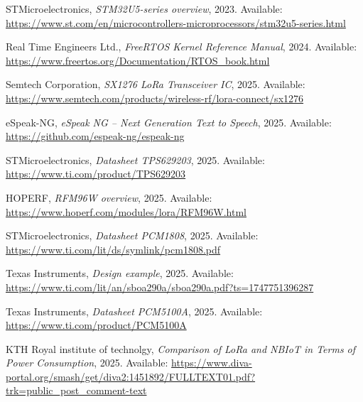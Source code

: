 \begin{thebibliography}{1}
STMicroelectronics,
\textit{STM32U5-series overview},
2023.
Available: \url{https://www.st.com/en/microcontrollers-microprocessors/stm32u5-series.html}

Real Time Engineers Ltd.,
\textit{FreeRTOS Kernel Reference Manual},
2024.
Available: \url{https://www.freertos.org/Documentation/RTOS_book.html}

Semtech Corporation,
\textit{SX1276 LoRa Transceiver IC},
2025.
Available: \url{https://www.semtech.com/products/wireless-rf/lora-connect/sx1276}

eSpeak-NG, 
\textit{eSpeak NG -- Next Generation Text to Speech}, 
2025. 
Available: \url{https://github.com/espeak-ng/espeak-ng}

STMicroelectronics,
\textit{Datasheet TPS629203}, 
2025. 
Available: \url{https://www.ti.com/product/TPS629203}

HOPERF,
\textit{RFM96W overview}, 
2025. 
Available: \url{https://www.hoperf.com/modules/lora/RFM96W.html}

STMicroelectronics,
\textit{Datasheet PCM1808}, 
2025. 
Available: \url{https://www.ti.com/lit/ds/symlink/pcm1808.pdf}

Texas Instruments,
\textit{Design example}, 
2025. 
Available: \url{https://www.ti.com/lit/an/sboa290a/sboa290a.pdf?ts=1747751396287}

Texas Instruments,
\textit{Datasheet PCM5100A}, 
2025. 
Available: \url{https://www.ti.com/product/PCM5100A}

KTH Royal institute of technolgy,
\textit{Comparison of LoRa and NBIoT in Terms of Power
Consumption}, 
2025. 
Available: \url{https://www.diva-portal.org/smash/get/diva2:1451892/FULLTEXT01.pdf?trk=public_post_comment-text}





\end{thebibliography}
